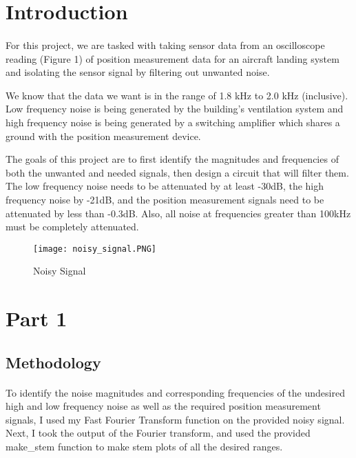 \newpage
\section{Introduction}
\paragraph{}
For this project, we are tasked with taking sensor data from an oscilloscope reading (Figure 1) of position measurement data for an aircraft landing system and isolating the sensor signal by filtering out unwanted noise.  
\par 
We know that the data we want is in the range of 1.8 kHz to 2.0 kHz (inclusive).  Low frequency noise is being generated by the building's ventilation system and high frequency noise is being generated by a switching amplifier which shares a ground with the position measurement device.
\par 
The goals of this project are to first identify the magnitudes and frequencies of both the unwanted and needed signals, then design a circuit that will filter them.  The low frequency noise needs to be attenuated by at least -30dB, the high frequency noise by -21dB, and the position measurement signals need to be attenuated by less than -0.3dB.  Also, all noise at frequencies greater than 100kHz must be completely attenuated.    

 \begin{figure}[H]
   \centering
   \texttt{[image: noisy\_signal.PNG]}
   \caption{Noisy Signal}
 \end{figure}

\section{Part 1}
\subsection{Methodology}
\paragraph{}
To identify the noise magnitudes and corresponding frequencies of the undesired high and low frequency noise as well as the required position measurement signals, I used my Fast Fourier Transform function on the provided noisy signal.  Next, I took the output of the Fourier transform, and used the provided make\_stem function to make stem plots of all the desired ranges.

